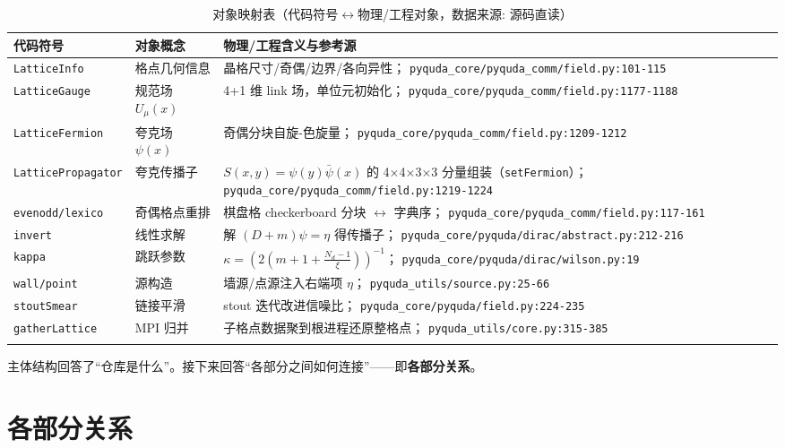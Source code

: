 \documentclass[UTF8]{ctexart}
\begin{document}
\begin{xltabular}{\textwidth}{llX}
\toprule
\textcolor{struct}{代码符号} & 对象概念 & 物理/工程含义与参考源 \\
\midrule
\endhead
\texttt{\nolinkurl{LatticeInfo}} & 格点几何信息 & 晶格尺寸/奇偶/边界/各向异性；
\texttt{\nolinkurl{pyquda_core/pyquda_comm/field.py:101-115}} \\
\texttt{\nolinkurl{LatticeGauge}} & 规范场 $U_\mu(x)$ & 4+1 维 link 场，单位元初始化；
\texttt{\nolinkurl{pyquda_core/pyquda_comm/field.py:1177-1188}} \\
\texttt{\nolinkurl{LatticeFermion}} & 夸克场 $\psi(x)$ & 奇偶分块自旋-色旋量；
\texttt{\nolinkurl{pyquda_core/pyquda_comm/field.py:1209-1212}} \\
\texttt{\nolinkurl{LatticePropagator}} & 夸克传播子 & $S(x,y)=\psi(y)\bar\psi(x)$ 的
4×4×3×3 分量组装（\texttt{setFermion}）；\texttt{\nolinkurl{pyquda_core/pyquda_comm/field.py:1219-1224}} \\
\texttt{\nolinkurl{evenodd/lexico}} & 奇偶格点重排 & 棋盘格 checkerboard 分块 $\leftrightarrow$ 字典序；
\texttt{\nolinkurl{pyquda_core/pyquda_comm/field.py:117-161}} \\
\texttt{\nolinkurl{invert}} & 线性求解 & 解 $(D+m)\psi=\eta$ 得传播子；
\texttt{\nolinkurl{pyquda_core/pyquda/dirac/abstract.py:212-216}} \\
\texttt{\nolinkurl{kappa}} & 跳跃参数 & $\kappa=(2(m+1+\frac{N_d-1}{\xi}))^{-1}$；
\texttt{\nolinkurl{pyquda_core/pyquda/dirac/wilson.py:19}} \\
\texttt{\nolinkurl{wall/point}} & 源构造 & 墙源/点源注入右端项 $\eta$；
\texttt{\nolinkurl{pyquda_utils/source.py:25-66}} \\
\texttt{\nolinkurl{stoutSmear}} & 链接平滑 & stout 迭代改进信噪比；
\texttt{\nolinkurl{pyquda_core/pyquda/field.py:224-235}} \\
\texttt{\nolinkurl{gatherLattice}} & MPI 归并 & 子格点数据聚到根进程还原整格点；
\texttt{\nolinkurl{pyquda_utils/core.py:315-385}} \\
\bottomrule
\caption{对象映射表（代码符号$\leftrightarrow$物理/工程对象，数据来源: 源码直读）}
\end{xltabular}

主体结构回答了“仓库是什么”。接下来回答“各部分之间如何连接”——即\textbf{各部分关系}。

\section{各部分关系}
\end{document}
